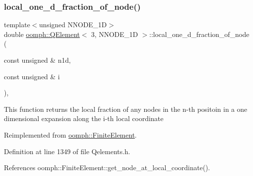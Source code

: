 \mbox{\label{classoomph_1_1QElement_3_013_00_01NNODE__1D_01_4_a1485bee3b772edabe9ab4e576031fd45}} 
\subsubsection{\texorpdfstring{local\+\_\+one\+\_\+d\+\_\+fraction\+\_\+of\+\_\+node()}{local\_one\_d\_fraction\_of\_node()}}
{\footnotesize\ttfamily template$<$unsigned N\+N\+O\+D\+E\+\_\+1D$>$ \\
double \hyperlink{classoomph_1_1QElement}{oomph\+::\+Q\+Element}$<$ 3, N\+N\+O\+D\+E\+\_\+1D $>$\+::local\+\_\+one\+\_\+d\+\_\+fraction\+\_\+of\+\_\+node (\begin{DoxyParamCaption}\item[{const unsigned \&}]{n1d,  }\item[{const unsigned \&}]{i }\end{DoxyParamCaption})\hspace{0.3cm}{\ttfamily [inline]}, {\ttfamily [virtual]}}

This function returns the local fraction of any nodes in the n-\/th positoin in a one dimensional expansion along the i-\/th local coordinate 

Reimplemented from \hyperlink{classoomph_1_1FiniteElement_adb8ec7d2ceda37528c2d4542d572edf4}{oomph\+::\+Finite\+Element}.



Definition at line 1349 of file Qelements.\+h.



References oomph\+::\+Finite\+Element\+::get\+\_\+node\+\_\+at\+\_\+local\+\_\+coordinate().

\mbox{\label{classoomph_1_1QElement_3_013_00_01NNODE__1D_01_4_a3de3fa35517dc2b5bd7b2e90069dc761}} 
